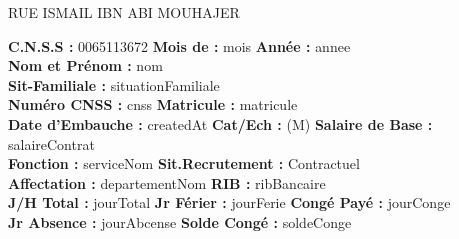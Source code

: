\documentclass[a4paper,12pt]{article}
\begin{document}
\noindent
RUE ISMAIL IBN ABI MOUHAJER


\noindent
\textbf{C.N.S.S :} {0065113672} \hfill \textbf{Mois de :} {{ mois }} \hfill \textbf{Année :} {{ annee }}\\[0.5cm]


\noindent
\noindent
\textbf{Nom et Prénom :} {{ nom }}\\[0.2cm]
\textbf{Sit-Familiale :} {{ situationFamiliale }}\\[0.2cm]
\textbf{Numéro CNSS :} {{ cnss }} \hfill \textbf{Matricule :} {{ matricule }}\\[0.2cm]
\textbf{Date d'Embauche :} {{ createdAt }} \hfill 
\textbf{Cat/Ech :} (M) \hfill 
\textbf{Salaire de Base :} {{ salaireContrat }}\\[0.2cm]
\textbf{Fonction :} {{ serviceNom }} \hfill 
\textbf{Sit.Recrutement :} Contractuel\\[0.2cm]
\textbf{Affectation :} {{ departementNom }} \hfill 
\textbf{RIB :} {{ ribBancaire }}\\[0.2cm]
\textbf{J/H Total :} {{ jourTotal }} \hfill
\textbf{Jr Férier :} {{ jourFerie }} \hfill
\textbf{Congé Payé :} {{ jourConge }}\\[0.2cm]
\textbf{Jr Absence :} {{ jourAbcense }} \hfill
\textbf{Solde Congé :} {{ soldeConge }}
\end{document}
